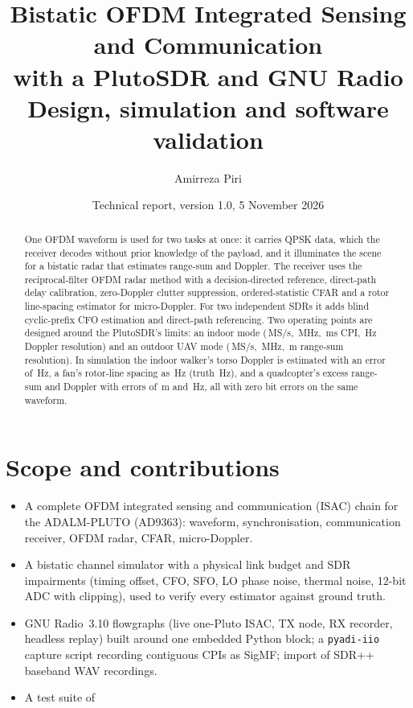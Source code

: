 \documentclass[10pt,a4paper]{article}
\title{\textbf{Bistatic OFDM Integrated Sensing and Communication\\with a PlutoSDR and GNU Radio}\\[4pt]
\large Design, simulation and software validation}
\author{Amirreza Piri}
\date{Technical report, version 1.0, 5 November 2026}
\newcommand{\code}[1]{\texttt{#1}}
\begin{document}
\maketitle


\begin{abstract}
\noindent One OFDM waveform is used for two tasks at once: it carries QPSK data, which the receiver decodes
without prior knowledge of the payload, and it illuminates the scene for a bistatic radar that estimates
range-sum and Doppler. The receiver uses the reciprocal-filter OFDM radar method with a decision-directed
reference, direct-path delay calibration, zero-Doppler clutter suppression, ordered-statistic CFAR and a rotor
line-spacing estimator for micro-Doppler. For two independent SDRs it adds blind cyclic-prefix CFO estimation
and direct-path referencing. Two operating points are designed around the PlutoSDR's limits: an indoor mode
(\FsI\,MS/s, \BoccI\,MHz, \TcpiI\,ms CPI, \DresI\,Hz Doppler resolution) and an outdoor UAV mode (\FsO\,MS/s,
\BoccO\,MHz, \RresO\,m range-sum resolution). In simulation the indoor walker's torso Doppler is estimated with
an error of \WalkDErr\,Hz, a fan's rotor-line spacing as \FanE\,Hz (truth \FanT\,Hz), and a quadcopter's excess
range-sum and Doppler with errors of \UavRErr\,m and \UavDErr\,Hz, all with zero bit errors on the same waveform.
\end{abstract}

\setcounter{tocdepth}{1}
\tableofcontents

\section{Scope and contributions}
\begin{itemize}
\item A complete OFDM integrated sensing and communication (ISAC) chain for the ADALM-PLUTO (AD9363):
waveform, synchronisation, communication receiver, OFDM radar, CFAR, micro-Doppler.
\item A bistatic channel simulator with a physical link budget and SDR impairments (timing offset, CFO, SFO, LO
phase noise, thermal noise, 12-bit ADC with clipping), used to verify every estimator against ground truth.
\item GNU Radio~3.10 flowgraphs (live one-Pluto ISAC, TX node, RX recorder, headless replay) built around one
embedded Python block; a \code{pyadi-iio} capture script recording contiguous CPIs as SigMF; import of SDR++
baseband WAV recordings.
\item A test suite of %
\end{itemize}
\end{document}
